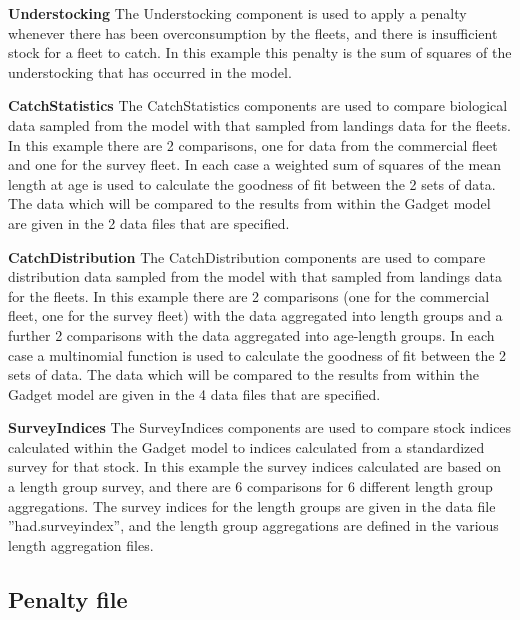 \documentclass[10pt,titlepage]{article}
\begin{document}
\bigskip
{\bf Understocking}\newline
The Understocking component is used to apply a penalty whenever there has been overconsumption by the fleets, and there is insufficient stock for a fleet to catch.  In this example this penalty is the sum of squares of the understocking that has occurred in the model.

\bigskip
{\bf CatchStatistics}\newline
The CatchStatistics components are used to compare biological data sampled from the model with that sampled from landings data for the fleets.  In this example there are 2 comparisons, one for data from the commercial fleet and one for the survey fleet.  In each case a weighted sum of squares of the mean length at age is used to calculate the goodness of fit between the 2 sets of data.  The data which will be compared to the results from within the Gadget model are given in the 2 data files that are specified.

\bigskip
{\bf CatchDistribution}\newline
The CatchDistribution components are used to compare distribution data sampled from the model with that sampled from landings data for the fleets.  In this example there are 2 comparisons (one for the commercial fleet, one for the survey fleet) with the data aggregated into length groups and a further 2 comparisons with the data aggregated into age-length groups.  In each case a multinomial function is used to calculate the goodness of fit between the 2 sets of data.  The data which will be compared to the results from within the Gadget model are given in the 4 data files that are specified.

\bigskip
{\bf SurveyIndices}\newline
The SurveyIndices components are used to compare stock indices calculated within the Gadget model to indices calculated from a standardized survey for that stock.  In this example the survey indices calculated are based on a length group survey, and there are 6 comparisons for 6 different length group aggregations.  The survey indices for the length groups are given in the data file ''had.surveyindex'', and the length group aggregations are defined in the various length aggregation files.

{\small }

\subsection{Penalty file}
\end{document}
